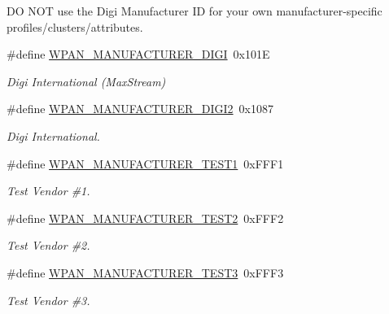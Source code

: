 D\-O N\-O\-T use the Digi Manufacturer I\-D for your own manufacturer-\/specific profiles/clusters/attributes. \begin{DoxyCompactItemize}
\item 
\hypertarget{group__wpan__aps_gaa70d29d210f9c88ba4d98192da5fe49e}{\#define \hyperlink{group__wpan__aps_gaa70d29d210f9c88ba4d98192da5fe49e}{W\-P\-A\-N\-\_\-\-M\-A\-N\-U\-F\-A\-C\-T\-U\-R\-E\-R\-\_\-\-D\-I\-G\-I}~0x101\-E}\label{group__wpan__aps_gaa70d29d210f9c88ba4d98192da5fe49e}

\begin{DoxyCompactList}\small\item\em Digi International (Max\-Stream) \end{DoxyCompactList}\item 
\hypertarget{group__wpan__aps_ga1ead60857a680665668ceefcc848476f}{\#define \hyperlink{group__wpan__aps_ga1ead60857a680665668ceefcc848476f}{W\-P\-A\-N\-\_\-\-M\-A\-N\-U\-F\-A\-C\-T\-U\-R\-E\-R\-\_\-\-D\-I\-G\-I2}~0x1087}\label{group__wpan__aps_ga1ead60857a680665668ceefcc848476f}

\begin{DoxyCompactList}\small\item\em Digi International. \end{DoxyCompactList}\item 
\hypertarget{group__wpan__aps_ga5c6e0e7a7b405359bceb6d8ccb95ea87}{\#define \hyperlink{group__wpan__aps_ga5c6e0e7a7b405359bceb6d8ccb95ea87}{W\-P\-A\-N\-\_\-\-M\-A\-N\-U\-F\-A\-C\-T\-U\-R\-E\-R\-\_\-\-T\-E\-S\-T1}~0x\-F\-F\-F1}\label{group__wpan__aps_ga5c6e0e7a7b405359bceb6d8ccb95ea87}

\begin{DoxyCompactList}\small\item\em Test Vendor \#1. \end{DoxyCompactList}\item 
\hypertarget{group__wpan__aps_ga45102d99f16b30fb8773a2c8d1a03865}{\#define \hyperlink{group__wpan__aps_ga45102d99f16b30fb8773a2c8d1a03865}{W\-P\-A\-N\-\_\-\-M\-A\-N\-U\-F\-A\-C\-T\-U\-R\-E\-R\-\_\-\-T\-E\-S\-T2}~0x\-F\-F\-F2}\label{group__wpan__aps_ga45102d99f16b30fb8773a2c8d1a03865}

\begin{DoxyCompactList}\small\item\em Test Vendor \#2. \end{DoxyCompactList}\item 
\hypertarget{group__wpan__aps_ga688f8334e635eccefb38df9ae08d8689}{\#define \hyperlink{group__wpan__aps_ga688f8334e635eccefb38df9ae08d8689}{W\-P\-A\-N\-\_\-\-M\-A\-N\-U\-F\-A\-C\-T\-U\-R\-E\-R\-\_\-\-T\-E\-S\-T3}~0x\-F\-F\-F3}\label{group__wpan__aps_ga688f8334e635eccefb38df9ae08d8689}

\begin{DoxyCompactList}\small\item\em Test Vendor \#3. \end{DoxyCompactList}\end{DoxyCompactItemize}
